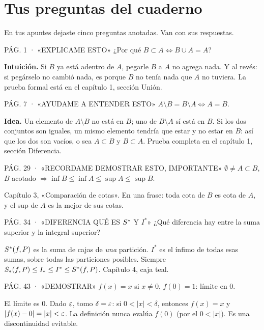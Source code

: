 \appendix
\chapter{Tus preguntas del cuaderno}
En tus apuntes dejaste cinco preguntas anotadas. Van con sus respuestas.

\begin{enunciado}{PÁG. 1 · «EXPLICAME ESTO»}
¿Por qué $B\subset A\iff B\cup A=A$?
\end{enunciado}
\textbf{Intuición.} Si $B$ ya está adentro de $A$, pegarle $B$ a $A$ no agrega nada. Y al revés: si pegárselo no cambió nada, es porque $B$ no tenía nada que $A$ no tuviera. La prueba formal está en el capítulo 1, sección Unión.

\begin{enunciado}{PÁG. 7 · «AYUDAME A ENTENDER ESTO»}
$A\setminus B=B\setminus A\iff A=B$.
\end{enunciado}
\textbf{Idea.} Un elemento de $A\setminus B$ no está en $B$; uno de $B\setminus A$ sí está en $B$. Si los dos conjuntos son iguales, un mismo elemento tendría que estar y no estar en $B$: así que los dos son vacíos, o sea $A\subset B$ y $B\subset A$. Prueba completa en el capítulo 1, sección Diferencia.

\begin{enunciado}{PÁG. 29 · «RECORDAME DEMOSTRAR ESTO, IMPORTANTE»}
$\emptyset\neq A\subset B$, $B$ acotado $\Rightarrow\inf B\le\inf A\le\sup A\le\sup B$.
\end{enunciado}
Capítulo 3, «Comparación de cotas». En una frase: toda cota de $B$ es cota de $A$, y el sup de $A$ es la mejor de sus cotas.

\begin{enunciado}{PÁG. 34 · «DIFERENCIA QUÉ ES $S^{*}$ Y $I^*$»}
¿Qué diferencia hay entre la suma superior y la integral superior?
\end{enunciado}
$S^{*}(f,P)$ es la suma de cajas de \emph{una} partición. $I^*$ es el ínfimo de todas esas sumas, sobre todas las particiones posibles. Siempre $S_{*}(f,P)\le I_*\le I^*\le S^{*}(f,P)$. Capítulo 4, caja teal.

\begin{enunciado}{PÁG. 43 · «DEMOSTRAR»}
$f(x)=x$ si $x\neq0$, $f(0)=1$: límite en 0.
\end{enunciado}
El límite es 0. Dado $\varepsilon$, tomo $\delta=\varepsilon$: si $0<|x|<\delta$, entonces $f(x)=x$ y $|f(x)-0|=|x|<\varepsilon$. La definición nunca evalúa $f(0)$ (por el $0<|x|$). Es una discontinuidad evitable.

